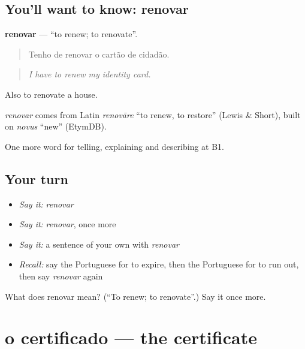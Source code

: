 \subsection*{You'll want to know: renovar}
\textbf{renovar} — \textquotedblleft{}to renew; to renovate\textquotedblright{}.

\begin{quote}
Tenho de renovar o cartão de cidadão.
\end{quote}

\begin{quote}
\emph{I have to renew my identity card.}
\end{quote}

Also to renovate a house.

\begin{cousinweb}
\emph{renovar} comes from Latin \emph{renovāre} \textquotedblleft{}to renew, to restore\textquotedblright{} (Lewis \& Short), built on \emph{novus} \textquotedblleft{}new\textquotedblright{} (EtymDB).
\end{cousinweb}

\begin{grammarlens}[title={What you've built}]
One more word for telling, explaining and describing at B1.
\end{grammarlens}

\subsection*{Your turn}
\begin{itemize}
\raggedright
  \item \emph{Say it:} \emph{renovar}
  \item \emph{Say it:} \emph{renovar}, once more
  \item \emph{Say it:} a sentence of your own with \emph{renovar}
  \item \emph{Recall:} say the Portuguese for to expire, then the Portuguese for to run out, then say \emph{renovar} again
\end{itemize}

\begin{tcolorbox}[breakable,colback=teal!4,colframe=teal!35!black,title={Before you move on}]
What does renovar mean? (\textquotedblleft{}To renew; to renovate\textquotedblright{}.) Say it once more.
\end{tcolorbox}
\section[o certificado]{o certificado — the certificate}

